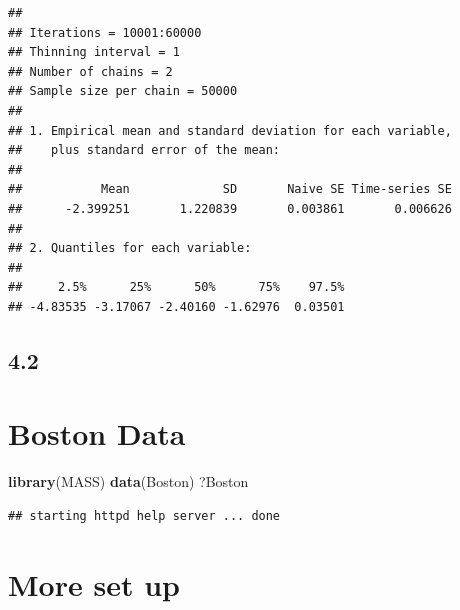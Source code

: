 \documentclass[
]{article}
\newenvironment{Shaded}{\begin{snugshade}}{\end{snugshade}}
\newcommand{\FunctionTok}[1]{\textcolor[rgb]{0.13,0.29,0.53}{\textbf{#1}}}
\newcommand{\NormalTok}[1]{#1}
\begin{document}
\begin{verbatim}
## 
## Iterations = 10001:60000
## Thinning interval = 1 
## Number of chains = 2 
## Sample size per chain = 50000 
## 
## 1. Empirical mean and standard deviation for each variable,
##    plus standard error of the mean:
## 
##           Mean             SD       Naive SE Time-series SE 
##      -2.399251       1.220839       0.003861       0.006626 
## 
## 2. Quantiles for each variable:
## 
##     2.5%      25%      50%      75%    97.5% 
## -4.83535 -3.17067 -2.40160 -1.62976  0.03501
\end{verbatim}

\subsection{4.2}\label{section-2}

\section{Boston Data}\label{boston-data}

\begin{Shaded}
\begin{Highlighting}[]
\FunctionTok{library}\NormalTok{(MASS)}
\FunctionTok{data}\NormalTok{(Boston)}
\NormalTok{?Boston}
\end{Highlighting}
\end{Shaded}

\begin{verbatim}
## starting httpd help server ... done
\end{verbatim}

\section{More set up}\label{more-set-up}
\end{document}
